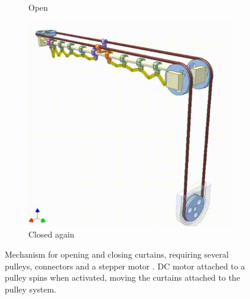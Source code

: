 \documentclass[a4paper,12pt]{article}
\begin{document}
\begin{figure}
\begin{subfigure}{0.3\textwidth}
        \caption{Open}
    \end{subfigure}
    \hfill
    \begin{subfigure}{0.3\textwidth}
        \includegraphics[width=\textwidth]{figures/initialCurtainMechanism3.png}
        \caption{Closed again}
    \end{subfigure}
    \caption{Mechanism for opening and closing curtains, requiring several pulleys, connectors and a stepper motor \cite{url:initialCurtainMechanism}. 
    DC motor attached to a pulley spins when activated, moving the curtains attached to the pulley system.}
    \label{fig:initialCurtainMechanism}
\end{figure}
\end{document}
